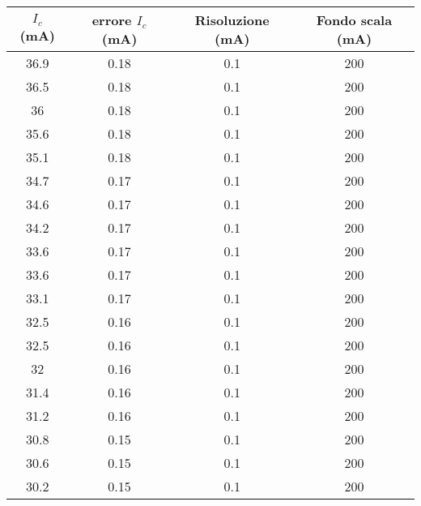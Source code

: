 \documentclass{article}
\begin{document}
\begin{table}[H]
    \centering
    \begin{tabular}{|c|c|c|c|}
        \hline
        $I_c$ (mA) & errore $I_c$ (mA) & Risoluzione (mA) & Fondo scala (mA) \\ \hline
        36.9       & 0.18              & 0.1              & 200              \\ \hline
        36.5       & 0.18              & 0.1              & 200              \\ \hline
        36         & 0.18              & 0.1              & 200              \\ \hline
        35.6       & 0.18              & 0.1              & 200              \\ \hline
        35.1       & 0.18              & 0.1              & 200              \\ \hline
        34.7       & 0.17              & 0.1              & 200              \\ \hline
        34.6       & 0.17              & 0.1              & 200              \\ \hline
        34.2       & 0.17              & 0.1              & 200              \\ \hline
        33.6       & 0.17              & 0.1              & 200              \\ \hline
        33.6       & 0.17              & 0.1              & 200              \\ \hline
        33.1       & 0.17              & 0.1              & 200              \\ \hline
        32.5       & 0.16              & 0.1              & 200              \\ \hline
        32.5       & 0.16              & 0.1              & 200              \\ \hline
        32         & 0.16              & 0.1              & 200              \\ \hline
        31.4       & 0.16              & 0.1              & 200              \\ \hline
        31.2       & 0.16              & 0.1              & 200              \\ \hline
        30.8       & 0.15              & 0.1              & 200              \\ \hline
        30.6       & 0.15              & 0.1              & 200              \\ \hline
        30.2       & 0.15              & 0.1              & 200              \\ \hline

\end{tabular}
\end{table}
\end{document}
